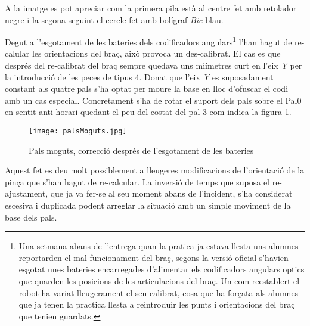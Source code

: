 A la imatge es pot apreciar com la primera pila està al centre fet amb
retolador negre i la segona seguint el cercle fet amb bolígraf \emph{Bic} blau.

Degut a l'esgotament de les bateries dels codificadors
angulars\footnote{Una setmana abans de l'entrega quan la pratica ja estava llesta uns
alumnes reportarden el mal funcionament del braç, segons la versió oficial
s'havien esgotat unes bateries encarregades d'alimentar els codificadors angulars
optics que quarden les posicions de les articulacions del braç. Un com reestablert el robot
ha variat lleugerament el seu calibrat, cosa que ha forçata als alumnes que ja tenen la practica
llesta a reintroduir les punts i orientacions del braç que tenien guardats.} 
l'han hagut de re-calular les orientacions del braç, això provoca un
des-calibrat. El cas es que després del re-calibrat
del braç sempre quedava uns mi\lgem ímetres curt en l'eix \emph{Y}
per la introducció de les peces de tipus 4. Donat que l'eix \emph{Y}
es suposadament constant als quatre pals s'ha optat per moure la base en lloc d'ofuscar
el codi amb un cas especial. Concretament s'ha de rotar el suport dels
pals sobre el Pal0 en sentit anti-horari quedant el peu del costat del pal 3
com indica la figura \ref{figpalmog}. 

\begin{figure}[H]
\begin{center}\label{figpalmog}
 \texttt{[image: palsMoguts.jpg]}
\end{center}
  \caption{Pals moguts, correcció després de l'esgotament de les bateries}
\end{figure}

Aquest fet es deu molt possiblement a lleugeres modificacions de l'orientació de la pinça
que s'han hagut de re-calcular. La inversió de temps que suposa el re-ajustament, que ja va
fer-se al seu moment abans de l'incident, s'ha considerat escesiva i duplicada podent arreglar
la situació amb un simple moviment de la base dels pals.
